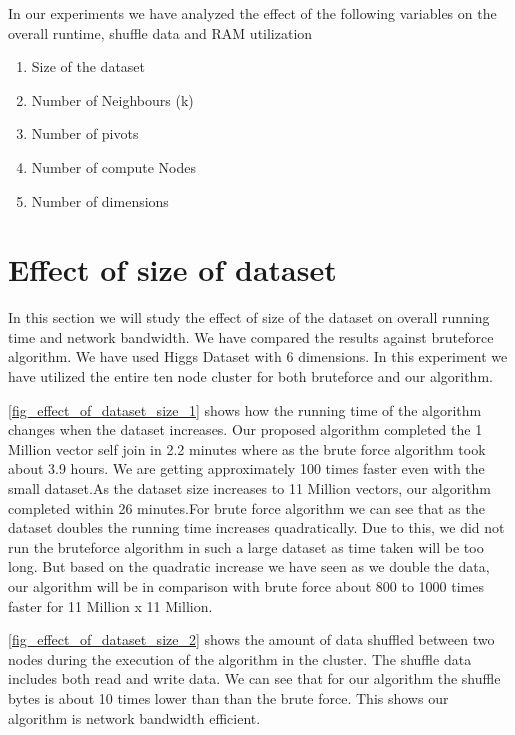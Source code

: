\begin{minipage}{\linewidth}
In our experiments we have analyzed the effect of the following variables on the
overall runtime, shuffle data and RAM utilization
\begin{enumerate}
\item Size of the dataset
\item Number of Neighbours (k)
\item Number of pivots
\item Number of compute Nodes
\item Number of dimensions
\end{enumerate}
\end{minipage}

\section{Effect of size of dataset}

In this section we will study the effect of size of the dataset on overall running
time and network bandwidth. We have compared the results against bruteforce algorithm.
We have used Higgs Dataset with 6 dimensions. In this experiment we
have utilized the entire ten node cluster for both bruteforce and our
algorithm.

\cref{fig_effect_of_dataset_size_1} shows how
the running time of the algorithm changes when the dataset increases.
Our proposed algorithm completed the 1 Million vector self join
in 2.2 minutes where as the brute force algorithm took about 3.9
hours. We are getting approximately 100 times faster even with the small
dataset.As the dataset size increases to 11 Million vectors, our
algorithm completed within 26 minutes.For brute force algorithm we can see that as the dataset doubles the running time
increases quadratically.  Due to this, we did not run the bruteforce
algorithm in such a large dataset as time taken will be too long. But
based on the quadratic increase we have seen as we double the data, our algorithm will be in comparison with
brute force about 800 to 1000 times faster for 11 Million x 11 Million.

\cref{fig_effect_of_dataset_size_2} shows the amount of data
shuffled between two nodes during the execution of the algorithm in
the cluster. The shuffle data includes both read and
write data. We can see that for our algorithm the shuffle bytes is
about 10 times lower than than the brute force. This shows our
algorithm is network bandwidth efficient.


